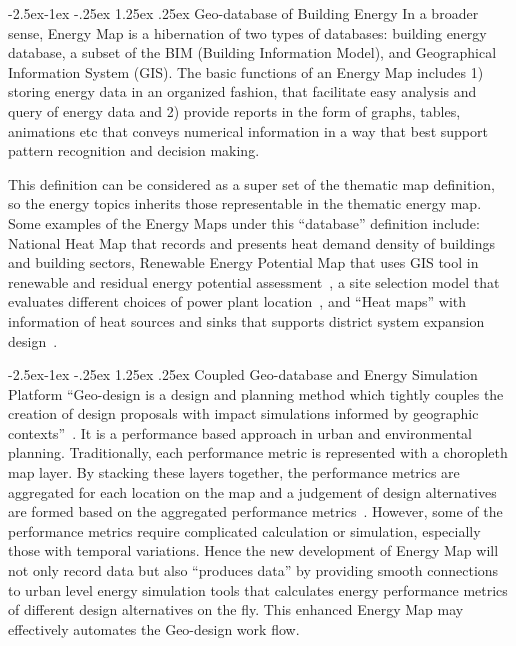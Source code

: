 \documentclass[hidelinks,12pt]{article}
\makeatletter
\renewcommand\paragraph{\@startsection{paragraph}{4}{\z@}%
            {-2.5ex\@plus -1ex \@minus -.25ex}%
            {1.25ex \@plus .25ex}%
            {\normalfont\normalsize\bfseries}}
\makeatother
\begin{document}
\paragraph{Geo-database of Building Energy}
In a broader sense, Energy Map is a hibernation of two types of
databases: building energy database, a subset of the BIM (Building
Information Model), and Geographical Information System (GIS). The
basic functions of an Energy Map includes 1) storing energy data in an
organized fashion, that facilitate easy analysis and query of energy
data and 2) provide reports in the form of graphs, tables, animations
etc that conveys numerical information in a way that best support
pattern recognition and decision making. 

This definition can be considered as a super set of the thematic map
definition, so the energy topics inherits those representable in the
thematic energy map. Some examples of the Energy Maps under this
``database'' definition include: National Heat Map that records and
presents heat demand density of buildings and building sectors,
Renewable Energy Potential Map that uses GIS tool in renewable and
residual energy potential assessment~\cite{Voivontas1998333}, a site
selection model that evaluates different choices of power plant
location~\cite{Yeo201499}, and ``Heat maps'' with information of heat
sources and sinks that supports district system expansion
design~\cite{Finney2012165}.

\paragraph{Coupled Geo-database and Energy Simulation Platform}
``Geo-design is a design and planning method which tightly couples the
creation of design proposals with impact simulations informed by
geographic contexts''~\cite{Flaxman2010}. It is a performance based
approach in urban and environmental planning. Traditionally, each
performance metric is represented with a choropleth map layer. By
stacking these layers together, the performance metrics are aggregated
for each location on the map and a judgement of design alternatives
are formed based on the aggregated performance
metrics~\cite{CPcp66-goodchild}. However, some of the performance
metrics require complicated calculation or simulation, especially
those with temporal variations. Hence the new development of Energy
Map will not only record data but also ``produces data'' by providing
smooth connections to urban level energy simulation tools that
calculates energy performance metrics of different design alternatives
on the fly. This enhanced Energy Map may effectively automates
the Geo-design work flow.
\end{document}
